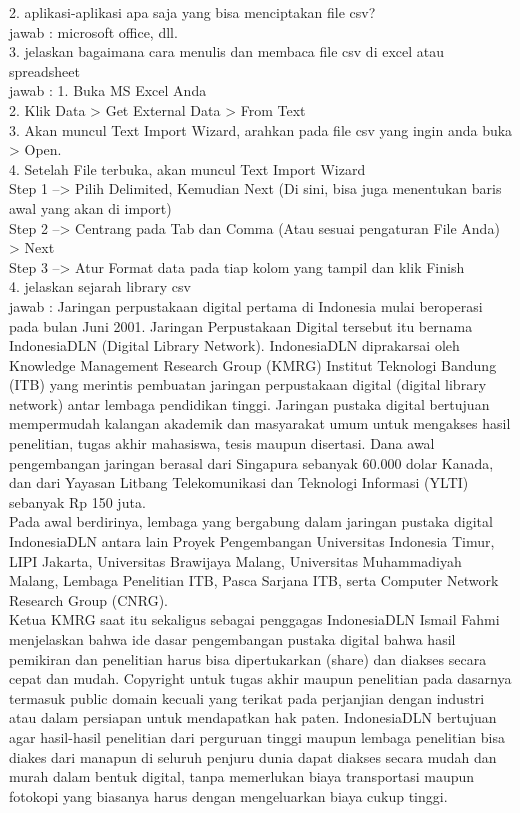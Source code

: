 \begin{enumerate}
\begin{enumerate}
2. aplikasi-aplikasi apa saja yang bisa menciptakan file csv?\\
jawab : microsoft office, dll.\\

3. jelaskan bagaimana cara menulis dan membaca file csv di excel atau spreadsheet\\
jawab : 1. Buka MS Excel Anda\\
2. Klik Data > Get External Data > From Text\\ 
3. Akan muncul Text Import Wizard, arahkan pada file csv yang ingin anda buka > Open.\\
4. Setelah File terbuka, akan muncul Text Import Wizard\\
Step 1 –> Pilih Delimited, Kemudian Next (Di sini, bisa juga menentukan baris awal yang akan di import)\\
Step 2 –> Centrang pada Tab dan Comma (Atau sesuai pengaturan File Anda) > Next\\
Step 3 –> Atur Format data pada tiap kolom yang tampil dan klik Finish\\

4. jelaskan sejarah library csv\\
jawab : Jaringan perpustakaan digital pertama di Indonesia mulai beroperasi pada bulan Juni 2001.  Jaringan Perpustakaan Digital tersebut itu bernama IndonesiaDLN (Digital Library Network).  IndonesiaDLN diprakarsai oleh Knowledge Management Research Group (KMRG) Institut Teknologi Bandung (ITB) yang merintis pembuatan jaringan perpustakaan digital (digital library network) antar lembaga pendidikan tinggi.  Jaringan pustaka digital bertujuan mempermudah kalangan akademik dan masyarakat umum untuk mengakses hasil penelitian, tugas akhir mahasiswa, tesis maupun disertasi. Dana awal pengembangan jaringan berasal dari Singapura sebanyak 60.000 dolar Kanada, dan dari Yayasan Litbang Telekomunikasi dan Teknologi Informasi (YLTI) sebanyak Rp 150 juta. \\

Pada awal berdirinya, lembaga yang bergabung dalam jaringan pustaka digital IndonesiaDLN antara lain Proyek Pengembangan Universitas Indonesia Timur, LIPI Jakarta, Universitas Brawijaya Malang, Universitas Muhammadiyah Malang, Lembaga Penelitian ITB, Pasca Sarjana ITB, serta Computer Network Research Group (CNRG).\\

Ketua KMRG saat itu sekaligus sebagai penggagas IndonesiaDLN Ismail Fahmi menjelaskan bahwa ide dasar pengembangan pustaka digital bahwa hasil pemikiran dan penelitian harus bisa dipertukarkan (share) dan diakses secara cepat dan mudah. Copyright untuk tugas akhir maupun penelitian pada dasarnya termasuk public domain kecuali yang terikat pada perjanjian dengan industri atau dalam persiapan untuk mendapatkan hak paten. IndonesiaDLN bertujuan agar hasil-hasil penelitian dari perguruan tinggi maupun lembaga penelitian bisa diakes dari manapun di seluruh penjuru dunia dapat diakses secara mudah dan murah dalam bentuk digital, tanpa memerlukan biaya transportasi maupun fotokopi yang biasanya harus dengan mengeluarkan biaya cukup tinggi.\\


\end{enumerate}
\end{enumerate}
